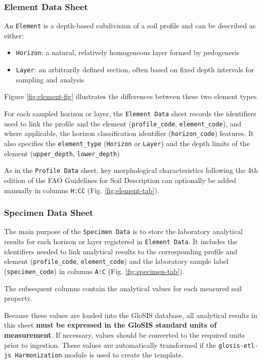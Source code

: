 \documentclass[
  10pt,
  b5paper,
  oneside]{book}
\begin{document}
\subsubsection{Element Data Sheet}\label{element-data-sheet}

An \texttt{Element} is a depth-based subdivision of a soil profile and can be described as either:

\begin{itemize}
\item
  \texttt{Horizon}: a natural, relatively homogeneous layer formed by pedogenesis
\item
  \texttt{Layer}: an arbitrarily defined section, often based on fixed depth intervals for sampling and analysis
\end{itemize}

Figure \ref{fig:element-fig} illustrates the differences between these two element types.

For each sampled horizon or layer, the \texttt{Element\ Data} sheet records the identifiers used to link the profile and the element (\texttt{profile\_code}, \texttt{element\_code}), and where applicable, the horizon classification identifier (\texttt{horizon\_code}) features. It also specifies the \texttt{element\_type} (\texttt{Horizon} or \texttt{Layer}) and the depth limits of the element (\texttt{upper\_depth}, \texttt{lower\_depth})

As in the \texttt{Profile\ Data} sheet, key morphological characteristics following the 4th edition of the FAO Guidelines for Soil Description can optionally be added manually in columns \texttt{H:CC} (Fig. \ref{fig:element-tab}).

\subsubsection{Specimen Data Sheet}\label{specimen-data-sheet}

The main purpose of the \texttt{Specimen\ Data} is to store the laboratory analytical results for each horizon or layer registered in \texttt{Element\ Data}. It includes the identifiers needed to link analytical results to the corresponding profile and element (\texttt{profile\_code}, \texttt{element\_code}) and the laboratory sample label (\texttt{specimen\_code}) in columns \texttt{A:C} (Fig. \ref{fig:specimen-tab}).

The subsequent columns contain the analytical values for each measured soil property.

Because these values are loaded into the GloSIS database, all analytical results in this sheet \textbf{must be expressed in the GloSIS standard units of measurement}. If necessary, values should be converted to the required units prior to ingestion. These values are automatically transformed if the \texttt{glosis-etl-js\ Harmonization} module is used to create the template.
\end{document}
